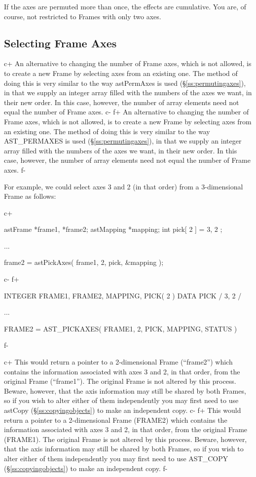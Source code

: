 \documentclass[twoside,11pt]{starlink}
\providecommand{\secref}[1]{\S\ref{#1}}
\begin{document}
If the axes are permuted more than once, the effects are cumulative.
You are, of course, not restricted to Frames with only two axes.

\subsection{Selecting Frame Axes}

c+
An alternative to changing the number of Frame axes, which is not
allowed, is to create a new Frame by selecting axes from an existing
one. The method of doing this is very similar to the way astPermAxes
is used (\secref{ss:permutingaxes}), in that we supply an integer
array filled with the numbers of the axes we want, in their new
order. In this case, however, the number of array elements need not
equal the number of Frame axes.
c-
f+
An alternative to changing the number of Frame axes, which is not
allowed, is to create a new Frame by selecting axes from an existing
one. The method of doing this is very similar to the way AST\_PERMAXES
is used (\secref{ss:permutingaxes}), in that we supply an integer
array filled with the numbers of the axes we want, in their new
order. In this case, however, the number of array elements need not
equal the number of Frame axes.
f-

For example, we could select axes 3 and 2 (in that order) from a
3-dimensional Frame as follows:

c+
\small
\begin{terminalv}
astFrame *frame1, *frame2;
astMapping *mapping;
int pick[ 2 ] = { 3, 2 };

...

frame2 = astPickAxes( frame1, 2, pick, &mapping );
\end{terminalv}
\normalsize
c-
f+
\small
\begin{terminalv}
      INTEGER FRAME1, FRAME2, MAPPING, PICK( 2 )
      DATA PICK / 3, 2 /

      ...

      FRAME2 = AST_PICKAXES( FRAME1, 2, PICK, MAPPING, STATUS )
\end{terminalv}
\normalsize
f-

c+
This would return a pointer to a 2-dimensional Frame (``frame2'')
which contains the information associated with axes 3 and 2, in that
order, from the original Frame (``frame1''). The original Frame is not
altered by this process. Beware, however, that the axis information
may still be shared by both Frames, so if you wish to alter either of
them independently you may first need to use astCopy
(\secref{ss:copyingobjects}) to make an independent copy.
c-
f+
This would return a pointer to a 2-dimensional Frame (FRAME2) which
contains the information associated with axes 3 and 2, in that order,
from the original Frame (FRAME1). The original Frame is not altered by
this process. Beware, however, that the axis information may still be
shared by both Frames, so if you wish to alter either of them
independently you may first need to use AST\_COPY
(\secref{ss:copyingobjects}) to make an independent copy.
f-
\end{document}
